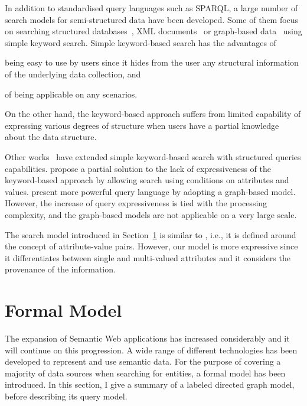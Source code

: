 In addition to standardised query languages such as SPARQL, a
large number of search models for semi-structured data have been developed. Some
of them focus on searching structured
databases~\cite{agrawal:2002:dbxplorer,bhalotia:2002:banks,hristidis:2002:discover,liu:2006:sigmod},
XML documents~\cite{cohen:2003:xsearch,guo:2003:xrank,liu:2007:xseek} or
graph-based data~\cite{abiteboul:1996:lorel,kachiola:2005:vldb,li:2008:ease}
using simple keyword search. Simple keyword-based search has the advantages of
\begin{inparaenum}[(1)]
\item being easy to use by users since it hides from the user any structural
information of the underlying data collection, and
\item of being applicable on any scenarios. 
\end{inparaenum}
On the other hand, the keyword-based approach suffers from limited capability
of expressing various degrees of structure when users have a partial knowledge
about the data structure.

Other
works~\cite{kasneci:2008:naga,mandreoli:2009:edbt,wang:2009:semplore,dong:2007:sigmod,fletcher:2009:theory-search}
have extended simple keyword-based search with structured queries
capabilities. \cite{dong:2007:sigmod,fletcher:2009:theory-search} propose a
partial solution to the lack of expressiveness of the keyword-based approach
by allowing search using conditions on attributes and values.
\cite{kasneci:2008:naga,mandreoli:2009:edbt,wang:2009:semplore} present more
powerful query language by adopting a graph-based model. However, the increase
of query expressiveness is tied with the processing complexity, and the
graph-based models
\cite{kasneci:2008:naga,mandreoli:2009:edbt,wang:2009:semplore} are not
applicable on a very large scale.

The search model introduced in Section~\ref{sec:siren-model} is similar to
\cite{dong:2007:sigmod,fletcher:2009:theory-search}, i.e., it is defined
around the concept of attribute-value pairs. However, our model is more
expressive since it differentiates between single and multi-valued attributes
and it considers the provenance of the information.

\section{Formal Model}
\label{sec:siren-model}

The expansion of Semantic Web applications has increased considerably and it
will continue on this progression. A wide range of different technologies has
been developed to represent and use semantic data. For the purpose of covering
a majority of data sources when searching for entities, a formal model has been
introduced. In this section, I give a summary of a labeled directed graph
model, before describing its query model.

